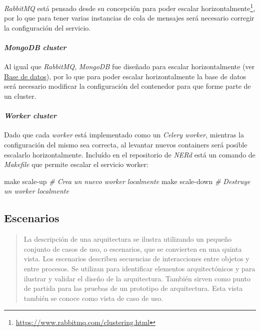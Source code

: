 \documentclass[12pt,a4paper,]{scrartcl}
\newenvironment{Shaded}{\begin{snugshade}}{\end{snugshade}}
\newcommand{\CommentTok}[1]{\textcolor[rgb]{0.56,0.35,0.01}{\textit{#1}}}
\newcommand{\FunctionTok}[1]{\textcolor[rgb]{0.00,0.00,0.00}{#1}}
\newcommand{\NormalTok}[1]{#1}
\let\oldparagraph\paragraph
\renewcommand{\paragraph}[1]{\oldparagraph{#1}\mbox{}}
\let\rmarkdownfootnote\footnote%
\def\footnote{\protect\rmarkdownfootnote}
\begin{document}
\emph{RabbitMQ} está pensado desde su concepción para poder escalar horizontalmente\footnote{\url{https://www.rabbitmq.com/clustering.html}}, por lo que para tener varias instancias de cola de mensajes será necesario corregir la configuración del servicio.

\hypertarget{mongodb-cluster}{%
\paragraph{\texorpdfstring{\emph{MongoDB cluster}}{MongoDB cluster}}\label{mongodb-cluster}}

Al igual que \emph{RabbitMQ}, \emph{MongoDB} fue diseñado para escalar horizontalmente (ver \protect\hyperlink{MongoDB-Dev}{Base de datos}), por lo que para poder escalar horizontalmente la base de datos será necesario modificar la configuración del contenedor para que forme parte de un cluster.

\hypertarget{worker-cluster}{%
\paragraph{\texorpdfstring{\emph{Worker cluster}}{Worker cluster}}\label{worker-cluster}}

Dado que cada \emph{worker} está implementado como un \emph{Celery worker}, mientras la configuración del mismo sea correcta, al levantar nuevos containers será posible escalarlo horizontalmente. Incluído en el repositorio de \emph{NERd} está un comando de \emph{Makefile} que permite escalar el servicio worker:

\begin{Shaded}
\begin{Highlighting}[]
\FunctionTok{make}\NormalTok{ scale-up }\CommentTok{# Crea un nuevo worker localmente}
\FunctionTok{make}\NormalTok{ scale-down }\CommentTok{# Destruye un worker localmente}
\end{Highlighting}
\end{Shaded}

\hypertarget{escenarios}{%
\subsection{Escenarios}\label{escenarios}}

\begin{quote}
La descripción de una arquitectura se ilustra utilizando un pequeño conjunto de casos de uso, o escenarios, que se convierten en una quinta vista.
Los escenarios describen secuencias de interacciones entre objetos y entre procesos.
Se utilizan para identificar elementos arquitectónicos y para ilustrar y validar el diseño de la arquitectura.
También sirven como punto de partida para las pruebas de un prototipo de arquitectura.
Esta vista también se conoce como vista de caso de uso.
\end{quote}
\end{document}
